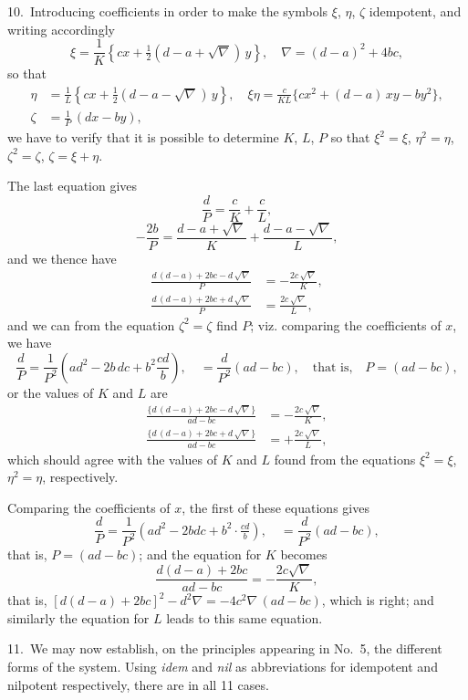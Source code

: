 \documentclass[11pt,a4paper]{article}
\theoremstyle{plain}
\theoremstyle{definition}
\theoremstyle{remark}
\begin{document}
\medskip

10.~Introducing coefficients in order to make the symbols $\xi$, $\eta$, $\zeta$ idempotent, and writing accordingly
\[
\xi = \frac{1}{K}\left\{cx + \tfrac{1}{2}(d-a+\sqrt{\nabla})\,y\right\},\quad \nabla = (d-a)^2 + 4bc,
\]
so that
\begin{align*}
\eta &= \frac{1}{L}\left\{cx + \tfrac{1}{2}(d-a-\sqrt{\nabla})\,y\right\},\quad \xi\eta = \frac{c}{KL}\{cx^2 + (d-a)\,xy - by^2\},\\
\zeta &= \frac{1}{P}\,(dx - by),
\end{align*}
we have to verify that it is possible to determine $K$, $L$, $P$ so that $\xi^2 = \xi$, $\eta^2 = \eta$, $\zeta^2 = \zeta$, $\zeta = \xi + \eta$.

The last equation gives
\[
\frac{d}{P} = \frac{c}{K} + \frac{c}{L},
\]
\[
-\frac{2b}{P} = \frac{d-a+\sqrt{\nabla}}{K} + \frac{d-a-\sqrt{\nabla}}{L},
\]
and we thence have
\begin{align*}
\frac{d\,(d-a) + 2bc - d\,\sqrt{\nabla}}{P} &= -\frac{2c\,\sqrt{\nabla}}{K},\\
\frac{d\,(d-a) + 2bc + d\,\sqrt{\nabla}}{P} &= \frac{2c\,\sqrt{\nabla}}{L},
\end{align*}
and we can from the equation $\zeta^2 = \zeta$ find $P$; viz. comparing the coefficients of $x$, we have
\[
\frac{d}{P} = \frac{1}{P^2}\left(ad^2 - 2b\,dc + b^2\frac{cd}{b}\right),\quad = \frac{d}{P^2}(ad-bc),\quad \text{that is,}\quad P = (ad-bc),
\]
or the values of $K$ and $L$ are
\begin{align*}
\frac{\{d\,(d-a) + 2bc - d\,\sqrt{\nabla}\}}{ad-bc} &= -\frac{2c\,\sqrt{\nabla}}{K},\\
\frac{\{d\,(d-a) + 2bc + d\,\sqrt{\nabla}\}}{ad-bc} &= +\frac{2c\,\sqrt{\nabla}}{L},
\end{align*}
which should agree with the values of $K$ and $L$ found from the equations $\xi^2 = \xi$, $\eta^2 = \eta$, respectively.

Comparing the coefficients of $x$, the first of these equations gives
\[
\frac{d}{P} = \frac{1}{P^2}(ad^2 - 2bdc + b^2\cdot\tfrac{cd}{b}),\quad = \frac{d}{P^2}(ad-bc),
\]
that is, $P = (ad-bc)$; and the equation for $K$ becomes
\[
\frac{d(d-a)+2bc}{ad-bc} = -\frac{2c\sqrt{\nabla}}{K},
\]
that is, $[d(d-a)+2bc]^2 - d^2\nabla = -4c^2\nabla\,(ad-bc)$, which is right; and similarly the equation for $L$ leads to this same equation.

11.~We may now establish, on the principles appearing in No.~5, the different forms of the system. Using \textit{idem} and \textit{nil} as abbreviations for idempotent and nilpotent respectively, there are in all 11 cases.
\end{document}
